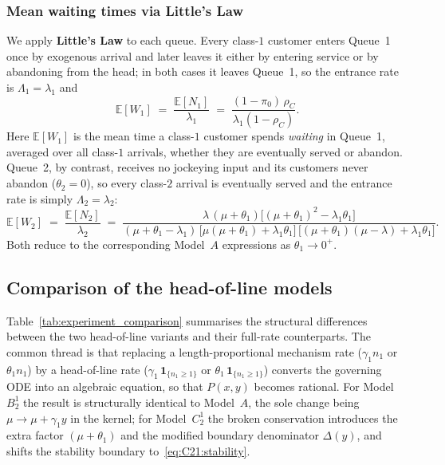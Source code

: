 \subsubsection{Mean waiting times via Little's Law}

We apply \textbf{Little's Law} to each queue. Every class-$1$ customer enters Queue~1 once
by exogenous arrival and later leaves it either by entering service or by abandoning from the
head; in both cases it leaves Queue~1, so the entrance rate is $\Lambda_1=\lambda_1$ and
\begin{equation}
    \mathbb{E}[W_1] \;=\; \frac{\mathbb{E}[N_1]}{\lambda_1}
    \;=\; \frac{(1-\pi_0)\,\rho_C}{\lambda_1(1-\rho_C)}.
    \label{eq:C21:EW1}
\end{equation}
Here $\mathbb{E}[W_1]$ is the mean time a class-$1$ customer spends \emph{waiting} in
Queue~1, averaged over all class-$1$ arrivals, whether they are eventually served or
abandon. Queue~2, by contrast, receives no jockeying input and its customers never abandon
($\theta_2=0$), so every class-$2$ arrival is eventually served and the entrance rate is
simply $\Lambda_2=\lambda_2$:
\begin{equation}
    \mathbb{E}[W_2] \;=\; \frac{\mathbb{E}[N_2]}{\lambda_2}
    \;=\; \frac{\lambda\,(\mu+\theta_1)\bigl[(\mu+\theta_1)^2-\lambda_1\theta_1\bigr]}
               {(\mu+\theta_1-\lambda_1)\,
                \bigl[\mu(\mu+\theta_1)+\lambda_1\theta_1\bigr]\,
                \bigl[(\mu+\theta_1)(\mu-\lambda)+\lambda_1\theta_1\bigr]}.
    \label{eq:C21:EW2}
\end{equation}
Both reduce to the corresponding Model~$A$ expressions as $\theta_1\to0^+$.

\subsection{Comparison of the head-of-line models}

Table~\ref{tab:experiment_comparison} summarises the structural differences between the two
head-of-line variants and their full-rate counterparts. The common thread is that replacing
a length-proportional mechanism rate ($\gamma_1 n_1$ or $\theta_1 n_1$) by a head-of-line
rate ($\gamma_1\,\mathbf{1}_{\{n_1\ge1\}}$ or $\theta_1\,\mathbf{1}_{\{n_1\ge1\}}$) converts
the governing ODE into an algebraic equation, so that $P(x,y)$ becomes rational. For
Model~$B_2^1$ the result is structurally identical to Model~$A$, the sole change being
$\mu\to\mu+\gamma_1 y$ in the kernel; for Model~$C_2^1$ the broken conservation introduces
the extra factor $(\mu+\theta_1)$ and the modified boundary denominator $\Delta(y)$, and
shifts the stability boundary to~\eqref{eq:C21:stability}.

